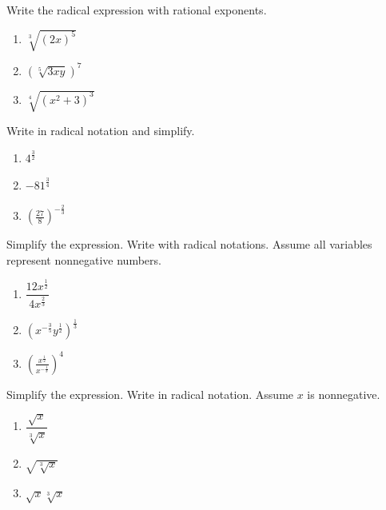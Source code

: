 \documentclass[en,11pt]{elegantbook}
\let\BeginKnitrBlock\begin \let\EndKnitrBlock\end
\begin{document}
\BeginKnitrBlock{exercise}
\protect\hypertarget{exr:unnamed-chunk-89}{}{\label{exr:unnamed-chunk-89} }
Write the radical expression with rational exponents.

\begin{enumerate}
\def\labelenumi{\arabic{enumi}.}

\item
  \(\sqrt[3]{(2x)^5}\)
\item
  \((\sqrt[5]{3xy})^7\)
\item
  \(\sqrt[4]{(x^2+3)^3}\)
\end{enumerate}
\EndKnitrBlock{exercise}

\BeginKnitrBlock{exercise}
\protect\hypertarget{exr:unnamed-chunk-90}{}{\label{exr:unnamed-chunk-90} }
Write in radical notation and simplify.

\begin{enumerate}
\def\labelenumi{\arabic{enumi}.}

\item
  \(4^{\frac32}\)
\item
  \(-81^{\frac 34}\)
\item
  \(\left(\frac{27}{8}\right)^{-\frac{2}{3}}\)
\end{enumerate}
\EndKnitrBlock{exercise}

\BeginKnitrBlock{exercise}
\protect\hypertarget{exr:unnamed-chunk-91}{}{\label{exr:unnamed-chunk-91} }
Simplify the expression. Write with radical notations. Assume all variables represent nonnegative numbers.

\begin{enumerate}
\def\labelenumi{\arabic{enumi}.}

\item
  \(\dfrac{12x^{\frac12}}{4x^{\frac23}}\)
\item
  \((x^{-\frac35}y^{\frac12})^{\frac13}\)
\item
  \(\left(\frac{x^{\frac12}}{x^{-\frac13}}\right)^4\)
\end{enumerate}
\EndKnitrBlock{exercise}

\BeginKnitrBlock{exercise}
\protect\hypertarget{exr:unnamed-chunk-92}{}{\label{exr:unnamed-chunk-92} }
Simplify the expression. Write in radical notation. Assume \(x\) is nonnegative.

\begin{enumerate}
\def\labelenumi{\arabic{enumi}.}

\item
  \(\dfrac{\sqrt{x}}{\sqrt[3]{x}}\)
\item
  \(\sqrt{\sqrt[3]{x}}\)
\item
  \(\sqrt{x}\sqrt[3]{x}\)
\end{enumerate}
\EndKnitrBlock{exercise}
\end{document}
